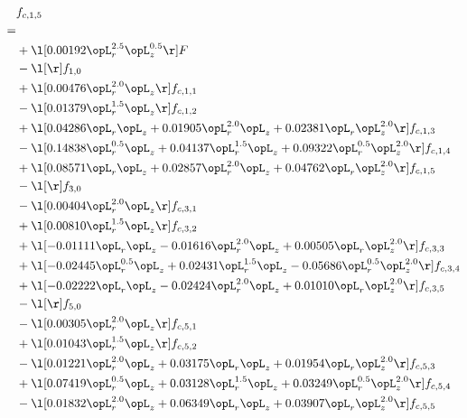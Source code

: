 \begin{alignat}{2} 
\label{eq:f_15_1} 
& f_{c,1,5} \nonumber \\ 
 = \\ 
& + \l[  0.00192 \opL_r^{2.5} \opL_z^{0.5}  \r] F \nonumber \\ 
& - \l[  \r] f_{1,0} \nonumber \\ 
& + \l[  0.00476 \opL_r^{2.0} \opL_z  \r] f_{c,1,1} \nonumber \\ 
& - \l[  0.01379 \opL_r^{1.5} \opL_z  \r] f_{c,1,2} \nonumber \\ 
& + \l[  0.04286 \opL_r \opL_z +  0.01905 \opL_r^{2.0} \opL_z +  0.02381 \opL_r \opL_z^{2.0}  \r] f_{c,1,3} \nonumber \\ 
& - \l[  0.14838 \opL_r^{0.5} \opL_z +  0.04137 \opL_r^{1.5} \opL_z +  0.09322 \opL_r^{0.5} \opL_z^{2.0}  \r] f_{c,1,4} \nonumber \\ 
& + \l[  0.08571 \opL_r \opL_z +  0.02857 \opL_r^{2.0} \opL_z +  0.04762 \opL_r \opL_z^{2.0}  \r] f_{c,1,5} \nonumber \\ 
& - \l[  \r] f_{3,0} \nonumber \\ 
& - \l[  0.00404 \opL_r^{2.0} \opL_z  \r] f_{c,3,1} \nonumber \\ 
& + \l[  0.00810 \opL_r^{1.5} \opL_z  \r] f_{c,3,2} \nonumber \\ 
& + \l[  -0.01111 \opL_r \opL_z   -0.01616 \opL_r^{2.0} \opL_z +  0.00505 \opL_r \opL_z^{2.0}  \r] f_{c,3,3} \nonumber \\ 
& + \l[  -0.02445 \opL_r^{0.5} \opL_z +  0.02431 \opL_r^{1.5} \opL_z   -0.05686 \opL_r^{0.5} \opL_z^{2.0}  \r] f_{c,3,4} \nonumber \\ 
& + \l[  -0.02222 \opL_r \opL_z   -0.02424 \opL_r^{2.0} \opL_z +  0.01010 \opL_r \opL_z^{2.0}  \r] f_{c,3,5} \nonumber \\ 
& - \l[  \r] f_{5,0} \nonumber \\ 
& - \l[  0.00305 \opL_r^{2.0} \opL_z  \r] f_{c,5,1} \nonumber \\ 
& + \l[  0.01043 \opL_r^{1.5} \opL_z  \r] f_{c,5,2} \nonumber \\ 
& - \l[  0.01221 \opL_r^{2.0} \opL_z +  0.03175 \opL_r \opL_z +  0.01954 \opL_r \opL_z^{2.0}  \r] f_{c,5,3} \nonumber \\ 
& + \l[  0.07419 \opL_r^{0.5} \opL_z +  0.03128 \opL_r^{1.5} \opL_z +  0.03249 \opL_r^{0.5} \opL_z^{2.0}  \r] f_{c,5,4} \nonumber \\ 
& - \l[  0.01832 \opL_r^{2.0} \opL_z +  0.06349 \opL_r \opL_z +  0.03907 \opL_r \opL_z^{2.0}  \r] f_{c,5,5} \nonumber \\ 

\end{alignat}
